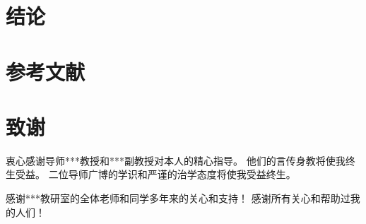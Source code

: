 
\section*{结\quad 论}								%
\newpage

\section*{参考文献}
\newpage											%
\section*{致\quad 谢	}								%
衷心感谢导师***教授和***副教授对本人的精心指导。
他们的言传身教将使我终生受益。
二位导师广博的学识和严谨的治学态度将使我受益终生。

感谢***教研室的全体老师和同学多年来的关心和支持！
感谢所有关心和帮助过我的人们！ 

